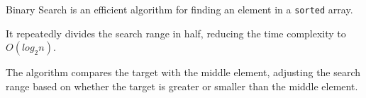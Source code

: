 Binary Search is an efficient algorithm for finding an element in a \texttt{sorted} array. 

It repeatedly divides the search range in half, reducing the time complexity to $O(log_2 n)$. 

The algorithm compares the target with the middle element, adjusting the search range based on whether the target is greater or smaller than the middle element.